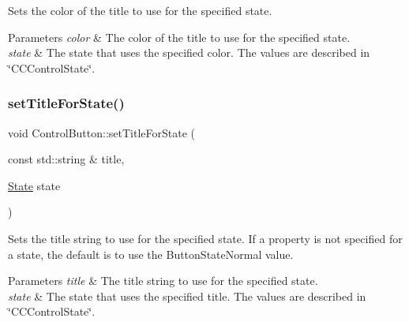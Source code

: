 Sets the color of the title to use for the specified state.


\begin{DoxyParams}{Parameters}
{\em color} & The color of the title to use for the specified state. \\
\hline
{\em state} & The state that uses the specified color. The values are described in \char`\"{}\+C\+C\+Control\+State\char`\"{}. \\
\hline
\end{DoxyParams}
\mbox{\label{classControlButton_ad2172e46a81238eaff511f9300ad1be7}} 
\subsubsection{\texorpdfstring{set\+Title\+For\+State()}{setTitleForState()}\hspace{0.1cm}{\footnotesize\ttfamily [1/2]}}
{\footnotesize\ttfamily void Control\+Button\+::set\+Title\+For\+State (\begin{DoxyParamCaption}\item[{const std\+::string \&}]{title,  }\item[{\hyperlink{classControl_a89e9598cd785841ac91cff3c4798c469}{State}}]{state }\end{DoxyParamCaption})\hspace{0.3cm}{\ttfamily [virtual]}}

Sets the title string to use for the specified state. If a property is not specified for a state, the default is to use the Button\+State\+Normal value.


\begin{DoxyParams}{Parameters}
{\em title} & The title string to use for the specified state. \\
\hline
{\em state} & The state that uses the specified title. The values are described in \char`\"{}\+C\+C\+Control\+State\char`\"{}. \\
\hline
\end{DoxyParams}
\mbox{\label{classControlButton_a911d31d0c0e4d137947184bc5043ac5d}} 
